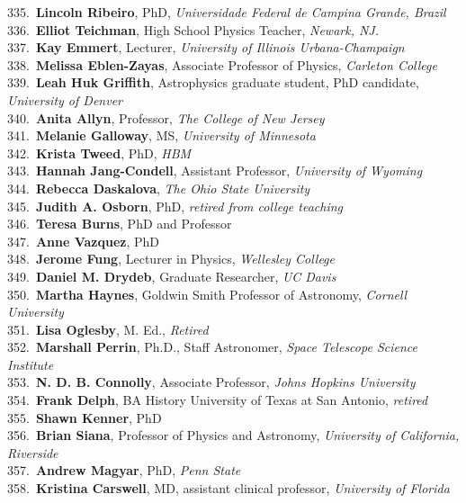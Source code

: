 335.~{\bf Lincoln Ribeiro}, PhD, {\sl Universidade Federal de Campina Grande, Brazil} \\
336.~{\bf Elliot Teichman}, High School Physics Teacher, {\sl Newark, NJ.} \\
337.~{\bf Kay Emmert}, Lecturer, {\sl University of Illinois Urbana-Champaign } \\
338.~{\bf Melissa Eblen-Zayas}, Associate Professor of Physics, {\sl Carleton College} \\
339.~{\bf Leah Huk Griffith}, Astrophysics graduate student, PhD candidate, {\sl University of Denver} \\
340.~{\bf Anita Allyn}, Professor, {\sl The College of New Jersey } \\
341.~{\bf Melanie Galloway}, MS, {\sl University of Minnesota} \\
342.~{\bf Krista Tweed}, PhD, {\sl HBM} \\
343.~{\bf Hannah Jang-Condell}, Assistant Professor, {\sl University of Wyoming} \\
344.~{\bf Rebecca Daskalova}, {\sl The Ohio State University} \\
345.~{\bf Judith A. Osborn}, PhD, {\sl retired from college teaching} \\
346.~{\bf Teresa Burns}, PhD and Professor \\
347.~{\bf Anne Vazquez}, PhD \\
348.~{\bf Jerome Fung}, Lecturer in Physics, {\sl Wellesley College} \\
349.~{\bf Daniel M. Drydeb}, Graduate Researcher, {\sl UC Davis} \\
350.~{\bf Martha Haynes}, Goldwin Smith Professor of Astronomy, {\sl Cornell University} \\
351.~{\bf Lisa Oglesby}, M. Ed., {\sl Retired} \\
352.~{\bf Marshall Perrin}, Ph.D., Staff Astronomer, {\sl Space Telescope Science Institute} \\
353.~{\bf N. D. B. Connolly}, Associate Professor, {\sl Johns Hopkins University} \\
354.~{\bf Frank Delph}, BA History University of Texas at San Antonio, {\sl retired} \\
355.~{\bf Shawn Kenner}, PhD \\
356.~{\bf Brian Siana}, Professor of Physics and Astronomy, {\sl University of California, Riverside} \\
357.~{\bf Andrew Magyar}, PhD, {\sl Penn State} \\
358.~{\bf Kristina Carswell}, MD, assistant clinical professor, {\sl University of Florida } \\
